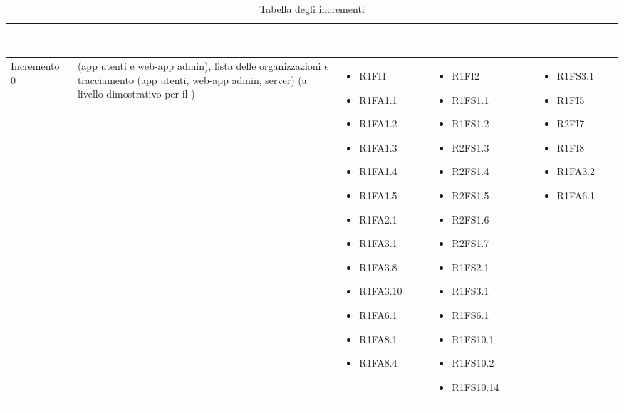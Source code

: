 {
\renewcommand{\arraystretch}{2}
\centering
	
\begin{longtable}{C{2.5cm} C{3.2cm} C{2.8cm} C{2.8cm} C{2.8cm}}
\caption{Tabella degli incrementi}\\
\textcolor{white}{\textbf{Incremento}} &
\textcolor{white}{\textbf{Obiettivo dell'incremento}} & 
\textcolor{white}{\textbf{Requisiti per l'app utenti}} &
\textcolor{white}{\textbf{Requisiti per il web-app admin}} &
\textcolor{white}{\textbf{Requisiti per il server}} \\
\endhead

Incremento 0 &  (app utenti e web-app admin), lista delle organizzazioni e tracciamento (app utenti, web-app admin, server) (a livello dimostrativo per il ) & \begin{itemize}
    \item[ ] R1FI1
    \item[ ] R1FA1.1
    \item[ ] R1FA1.2
    \item[ ] R1FA1.3
    \item[ ] R1FA1.4
    \item[ ] R1FA1.5
    \item[ ] R1FA2.1
    \item[ ] R1FA3.1
    \item[ ] R1FA3.8
    \item[ ] R1FA3.10
    \item[ ] R1FA6.1
    \item[ ] R1FA8.1
    \item[ ] R1FA8.4
\end{itemize} & \begin{itemize}
    \item[ ] R1FI2
    \item[ ] R1FS1.1
    \item[ ] R1FS1.2
    \item[ ] R2FS1.3
    \item[ ] R2FS1.4
    \item[ ] R2FS1.5
    \item[ ] R2FS1.6
    \item[ ] R2FS1.7
    \item[ ] R1FS2.1
    \item[ ] R1FS3.1
    \item[ ] R1FS6.1
    \item[ ] R1FS10.1
    \item[ ] R1FS10.2
    \item[ ] R1FS10.14
\end{itemize} & \begin{itemize} 
    \item[ ] R1FS3.1
    \item[ ] R1FI5
    \item[ ] R2FI7
    \item[ ] R1FI8
    \item[ ] R1FA3.2
    \item[ ] R1FA6.1


\end{itemize}
\end{longtable}}
